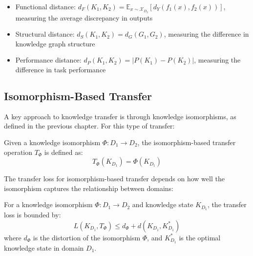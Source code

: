 \begin{itemize}
    \item Functional distance: $d_F(K_1, K_2) = \mathbb{E}_{x \sim \mathcal{X}_{D_2}}[d_Y(f_1(x), f_2(x))]$, measuring the average discrepancy in outputs
    \item Structural distance: $d_S(K_1, K_2) = d_G(G_1, G_2)$, measuring the difference in knowledge graph structure
    \item Performance distance: $d_P(K_1, K_2) = |P(K_1) - P(K_2)|$, measuring the difference in task performance
\end{itemize}

\subsection{Isomorphism-Based Transfer}

A key approach to knowledge transfer is through knowledge isomorphisms, as defined in the previous chapter. For this type of transfer:

\begin{definition}
Given a knowledge isomorphism $\Phi: D_1 \to D_2$, the isomorphism-based transfer operation $T_{\Phi}$ is defined as:
\begin{equation}
T_{\Phi}(K_{D_1}) = \Phi(K_{D_1})
\end{equation}
\end{definition}

The transfer loss for isomorphism-based transfer depends on how well the isomorphism captures the relationship between domains:

\begin{theorem}
For a knowledge isomorphism $\Phi: D_1 \to D_2$ and knowledge state $K_{D_1}$, the transfer loss is bounded by:
\begin{equation}
L(K_{D_1}, T_{\Phi}) \leq d_{\Phi} + d(K_{D_1}, K_{D_1}^*)
\end{equation}
where $d_{\Phi}$ is the distortion of the isomorphism $\Phi$, and $K_{D_1}^*$ is the optimal knowledge state in domain $D_1$.
\end{theorem}

